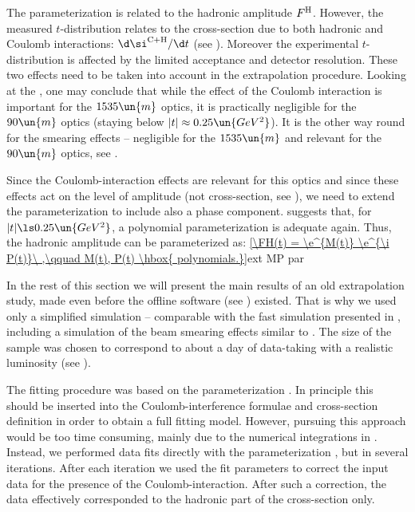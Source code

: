 The parameterization  is related to the hadronic amplitude $F^{\rm H}$. However, the measured $t$-distribution relates to the cross-section due to both hadronic and Coulomb interactions: $\d\si^{\rm C+H}/\d t$ (see ). Moreover the experimental $t$-distribution is affected by the limited acceptance and detector resolution. These two effects need to be taken into account in the extrapolation procedure. Looking at the , one may conclude that while the effect of the Coulomb interaction is important for the $1535\un{m}$ optics, it is practically negligible for the $90\un{m}$ optics (staying below $|t| \approx 0.25\un{GeV^2}$). It is the other way round for the smearing effects -- negligible for the $1535\un{m}$ and relevant for the $90\un{m}$ optics, see .

\def\OutlineLabel{Extrapolation for beta* = 1535 m optics}

Since the Coulomb-interaction effects are relevant for this optics and since these effects act on the level of amplitude (not cross-section, see ), we need to extend the parameterization  to include also a phase component.  suggests that, for $|t| \ls 0.25\un{GeV^2}$, a polynomial parameterization is adequate again. Thus, the hadronic amplitude can be parameterized as:
\eqref{\FH(t) = \e^{M(t)} \e^{\i P(t)}\ ,\qquad M(t), P(t) \hbox{ polynomials.}}{ext MP par}

In the rest of this section we will present the main results of an old extrapolation study, made even before the  offline software (see ) existed. That is why we used only a simplified  simulation -- comparable with the fast simulation presented in , including a simulation of the beam smearing effects similar to . The size of the  sample was chosen to correspond to about a day of data-taking with a realistic luminosity (see ).

The fitting procedure was based on the parameterization . In principle this should be inserted into the Coulomb-interference formulae  and cross-section definition  in order to obtain a full fitting model. However, pursuing this approach would be too time consuming, mainly due to the numerical integrations in . Instead, we performed data fits directly with the parameterization , but in several iterations. After each iteration we used the fit parameters to correct the input data for the presence of the Coulomb-interaction. After such a correction, the data effectively corresponded to the hadronic part of the cross-section only.

